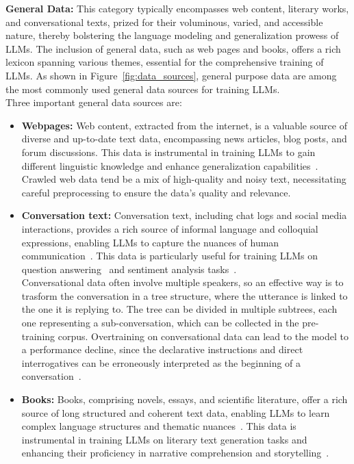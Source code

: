 \textbf{General Data:} This category typically encompasses web content, literary works, and conversational texts, prized for their voluminous, varied, and accessible nature, thereby bolstering the language modeling and generalization prowess of LLMs. The inclusion of general data, such as web pages and books, offers a rich lexicon spanning various themes, essential for the comprehensive training of LLMs. As shown in Figure~\ref{fig:data_sources}, general purpose data are among the most commonly used general data sources for training LLMs.\\
Three important general data sources are:
\begin{itemize}
	\item \textbf{Webpages:} {Web content, extracted from the internet, is a valuable source of diverse and up-to-date text data, encompassing news articles, blog posts, and forum discussions. This data is instrumental in training LLMs to gain different linguistic knowledge and enhance generalization capabilities~\cite{brown2020language, raffel2023exploring}.
		      Crawled web data tend be a mix of high-quality and noisy text, necessitating careful preprocessing to ensure the data's quality and relevance.
	      }
	\item \textbf{Conversation text:} {
		      Conversation text, including chat logs and social media interactions, provides a rich source of informal language and colloquial expressions, enabling LLMs to capture the nuances of human communication~\cite{zhang2022opt}. This data is particularly useful for training LLMs on question answering~\cite{chowdhery2022palm} and sentiment analysis tasks~\cite{zellers2019defending}.\\
		      Conversational data often involve multiple speakers, so an effective way is to trasform the conversation in a tree structure, where the utterance is linked to the one it is replying to. The tree can be divided in multiple subtrees, each one representing a sub-conversation, which can be collected in the pre-training corpus.
		      Overtraining on conversational data can lead to the model to a performance decline, since the declarative instructions and direct interrogatives can be erroneously interpreted as the beginning of a conversation~\cite{zhang2022opt}.
	      }
	\item \textbf{Books:} {
		      Books, comprising novels, essays, and scientific literature, offer a rich source of long structured and coherent text data, enabling LLMs to learn complex language structures and thematic nuances~\cite{zhu2015aligning}. This data is instrumental in training LLMs on literary text generation tasks and enhancing their proficiency in narrative comprehension and storytelling~\cite{radford2019language}.
	      }
\end{itemize}

